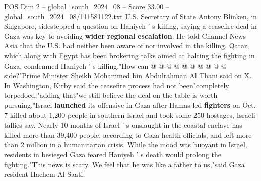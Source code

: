 \begin{textsample}{POS Dim 2 – global\_south\_2024\_08 – Score 33.00 – global\_south\_2024\_08/111581122.txt}
U.S.
Secretary of State Antony Blinken, in Singapore, sidestepped a question on Haniyeh ' s killing, saying a ceasefire deal in Gaza was key to avoiding \textbf{wider} \textbf{regional} \textbf{escalation}.
He told Channel News Asia that the U.S. had neither been aware of nor involved in the killing.
Qatar, which along with Egypt has been brokering talks aimed at halting the fighting in Gaza, condemned Haniyeh ' s killing."How can @ @ @ @ @ @ @ @ @ @ side?"Prime Minister Sheikh Mohammed bin Abdulrahman Al Thani said on X.
In Washington, Kirby said the ceasefire process had not been"completely torpedoed,"adding that"we still believe the deal on the table is worth pursuing."Israel \textbf{launched} its offensive in Gaza after Hamas-led \textbf{fighters} on Oct. 7 killed about 1,200 people in southern Israel and took some 250 hostages, Israeli tallies say.
Nearly 10 months of Israel ' s onslaught in the coastal enclave has killed more than 39,400 people, according to Gaza health officials, and left more than 2 million in a humanitarian crisis.
While the mood was buoyant in Israel, residents in besieged Gaza feared Haniyeh ' s death would prolong the fighting."This news is scary.
We feel that he was like a father to us,"said Gaza resident Hachem Al-Saati.

\end{textsample}
